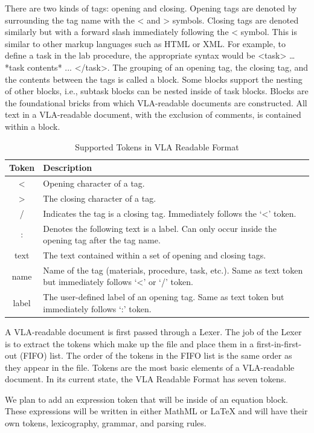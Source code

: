 \documentclass[11.5pt]{sig-alternate} %
\begin{document}
\begin{large}
There are two kinds of tags: opening and closing. Opening tags are denoted by surrounding the tag name with the < and > symbols. Closing tags are denoted similarly but with a forward slash immediately following the < symbol. This is similar to other markup languages such as HTML or XML. For example, to define a task in the lab procedure, the appropriate syntax would be <task> … *task contents* ...  </task>. The grouping of an opening tag, the closing tag, and the contents between the tags is called a block. Some blocks support the nesting of other blocks, i.e., subtask blocks can be nested inside of task blocks. Blocks are the foundational bricks from which VLA-readable documents are constructed. All text in a VLA-readable document, with the exclusion of comments, is contained within a block.

\begin{table}[ht]
\caption{Supported Tokens in VLA Readable Format}
\begin{tabular}{|c|l|}
\hline 
\textbf{Token} & \textbf{Description} \\ \hline
< & Opening character of a tag. \\ \hline
> & The closing character of a tag. \\ \hline
/ & Indicates the tag is a closing tag. Immediately follows the ‘<’ token. \\ \hline
: & Denotes the following text is a label. Can only occur inside the opening tag after the tag name. \\ \hline
text & The text contained within a set of opening and closing tags. \\ \hline
name & Name of the tag (materials, procedure, task, etc.). Same as text token but immediately follows ‘<’ or ‘/’ token. \\ \hline
label & The user-defined label of an opening tag. Same as text token but immediately follows ‘:’ token. \\ \hline
\end{tabular}
\end{table}

A VLA-readable document is first passed through a Lexer. The job of the Lexer is to extract the tokens which make up the file and place them in a first-in-first-out (FIFO) list. The order of the tokens in the FIFO list is the same order as they appear in the file. Tokens are the most basic elements of a VLA-readable document. In its current state, the VLA Readable Format has seven tokens.

We plan to add an expression token that will be inside of an equation block. These expressions will be written in either MathML or LaTeX and will have their own tokens, lexicography, grammar, and parsing rules. 


\end{large}
\end{document}
